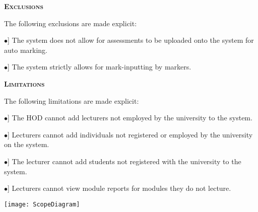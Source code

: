 \documentclass[12pt, a4paper]{scrartcl}
\newcommand{\tab}[1]{\hspace{.05\textwidth}\rlap{#1}}
\begin{document}
				\textsc{\bf Exclusions}
					\begin{description}
						\item The following exclusions are made explicit:
						\begin{description}
							\item \tab [$\bullet$] The system does not allow for assessments to be uploaded onto the system for auto marking.
							\item \tab [$\bullet$] The system strictly allows for mark-inputting by markers.
						\end{description}
 					\end{description}
				\textsc{\bf Limitations}
					\begin{description}
						\item The following limitations are made explicit:
						\begin{description}	
							\item \tab [$\bullet$] The HOD cannot add lecturers not employed by the university to the system.	
							\item \tab [$\bullet$] Lecturers cannot add individuals not registered or employed by the university on the system.	
							\item \tab [$\bullet$] The lecturer cannot add students not registered with the university to the system.	
							\item \tab [$\bullet$] Lecturers cannot view module reports for modules they do not lecture.
						\end{description}
						\item \tab \textsc{\bf Use-Case Diagram}
                		\item \texttt{[image: ScopeDiagram]}
                	\end{description}
\end{document}
